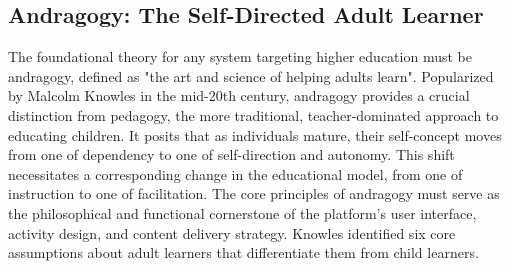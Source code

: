 \documentclass{article}
\begin{document}
\subsection{Andragogy: The Self-Directed Adult Learner}

The foundational theory for any system targeting higher education must be andragogy, defined as "the art and science of helping adults learn".\cite{1} Popularized by Malcolm Knowles in the mid-20th century, andragogy provides a crucial distinction from pedagogy, the more traditional, teacher-dominated approach to educating children.\cite{2, 3, 4} It posits that as individuals mature, their self-concept moves from one of dependency to one of self-direction and autonomy.\cite{1, 5, 6} This shift necessitates a corresponding change in the educational model, from one of instruction to one of facilitation. The core principles of andragogy must serve as the philosophical and functional cornerstone of the platform's user interface, activity design, and content delivery strategy. Knowles identified six core assumptions about adult learners that differentiate them from child learners.\cite{7, 8}
\end{document}
